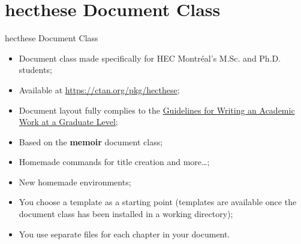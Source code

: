 
\section{hecthese Document Class}

\begin{frame}{hecthese Document Class}
	\begin{itemize}
		\item Document class made specifically for HEC Montréal's M.Sc. and Ph.D. students;
		\item Available at \href{https://ctan.org/pkg/hecthese}{https://ctan.org/pkg/hecthese};
		\item Document layout fully complies to the  
			\href{http://www.hec.ca/qualitecomm/anglais/ressources/guide-redaction-depot-memoire-anglais.pdf}{%
			Guidelines for Writing an Academic Work at a Graduate Level};
		\item Based on the \textbf{memoir} document class;
		\item Homemade commands for title creation and more\ldots;
		\item New homemade environments;
		\item You choose a template as a starting point (templates are available once the document class has been installed in a working directory);
		\item You use separate files for each chapter in your document.
	\end{itemize}
\end{frame}